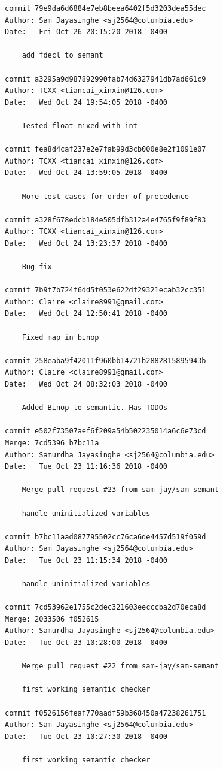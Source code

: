 \documentclass[12pt]{article}
\begin{document}
\begin{lstlisting}
commit 79e9da6d6884e7eb8beea6402f5d3203dea55dec
Author: Sam Jayasinghe <sj2564@columbia.edu>
Date:   Fri Oct 26 20:15:20 2018 -0400

    add fdecl to semant

commit a3295a9d987892990fab74d6327941db7ad661c9
Author: TCXX <tiancai_xinxin@126.com>
Date:   Wed Oct 24 19:54:05 2018 -0400

    Tested float mixed with int

commit fea8d4caf237e2e7fab99d3cb000e8e2f1091e07
Author: TCXX <tiancai_xinxin@126.com>
Date:   Wed Oct 24 13:59:05 2018 -0400

    More test cases for order of precedence

commit a328f678edcb184e505dfb312a4e4765f9f89f83
Author: TCXX <tiancai_xinxin@126.com>
Date:   Wed Oct 24 13:23:37 2018 -0400

    Bug fix

commit 7b9f7b724f6dd5f053e622df29321ecab32cc351
Author: Claire <claire8991@gmail.com>
Date:   Wed Oct 24 12:50:41 2018 -0400

    Fixed map in binop

commit 258eaba9f42011f960bb14721b2882815895943b
Author: Claire <claire8991@gmail.com>
Date:   Wed Oct 24 08:32:03 2018 -0400

    Added Binop to semantic. Has TODOs

commit e502f73507aef6f209a54b502235014a6c6e73cd
Merge: 7cd5396 b7bc11a
Author: Samurdha Jayasinghe <sj2564@columbia.edu>
Date:   Tue Oct 23 11:16:36 2018 -0400

    Merge pull request #23 from sam-jay/sam-semant
    
    handle uninitialized variables

commit b7bc11aad087795502cc76ca6de4457d519f059d
Author: Sam Jayasinghe <sj2564@columbia.edu>
Date:   Tue Oct 23 11:15:34 2018 -0400

    handle uninitialized variables

commit 7cd53962e1755c2dec321603eecccba2d70eca8d
Merge: 2033506 f052615
Author: Samurdha Jayasinghe <sj2564@columbia.edu>
Date:   Tue Oct 23 10:28:00 2018 -0400

    Merge pull request #22 from sam-jay/sam-semant
    
    first working semantic checker

commit f0526156feaf770aadf59b368450a47238261751
Author: Sam Jayasinghe <sj2564@columbia.edu>
Date:   Tue Oct 23 10:27:30 2018 -0400

    first working semantic checker


\end{lstlisting}
\end{document}
